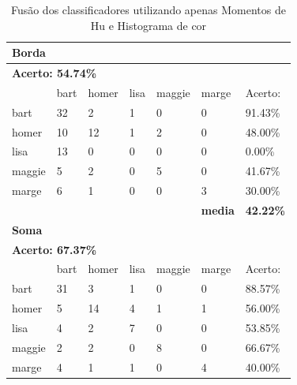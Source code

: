 \documentclass[journal]{IEEEtran}
\begin{document}
\begin{table}[!htb]
\centering
\caption{Fusão dos classificadores utilizando apenas Momentos de Hu e Histograma de cor}
\label{tbl:huandcolor}
\small
\singlespacing
\begin{tabular}{l|l|l|l|l|l|l}
\hline
\multicolumn{7}{l}{\textbf{Borda}}                                                          \\ \hline
\multicolumn{7}{l}{\textbf{Acerto: 54.74\%}}                                                  \\ \hline
          & bart      & homer     & lisa      & maggie    & marge          & Acerto:            \\ \hline
bart      & 32        & 2         & 1         & 0         & 0              & 91.43\%          \\ \hline
homer     & 10        & 12        & 1         & 2         & 0              & 48.00\%          \\ \hline
lisa      & 13        & 0         & 0         & 0         & 0              & 0.00\%           \\ \hline
maggie    & 5         & 2         & 0         & 5         & 0              & 41.67\%          \\ \hline
marge     & 6         & 1         & 0         & 0         & 3              & 30.00\%          \\ \hline
\textbf{} & \textbf{} & \textbf{} & \textbf{} & \textbf{} & \textbf{media} & \textbf{42.22\%} \\ \hline
\multicolumn{7}{l}{\textbf{Soma}}                                                            \\ \hline
\multicolumn{7}{l}{\textbf{Acerto: 67.37\%}}                                                  \\ \hline
          & bart      & homer     & lisa      & maggie    & marge          & Acerto:            \\ \hline
bart      & 31        & 3         & 1         & 0         & 0              & 88.57\%          \\ \hline
homer     & 5         & 14        & 4         & 1         & 1              & 56.00\%          \\ \hline
lisa      & 4         & 2         & 7         & 0         & 0              & 53.85\%          \\ \hline
maggie    & 2         & 2         & 0         & 8         & 0              & 66.67\%          \\ \hline
marge     & 4         & 1         & 1         & 0         & 4              & 40.00\%          \\ \hline

\end{tabular}
\end{table}
\end{document}
